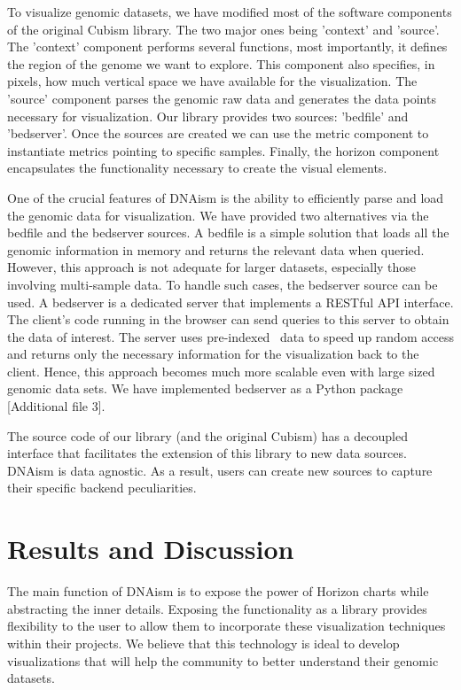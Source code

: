 \documentclass[twocolumn]{bmcart}
\begin{document}
To visualize genomic datasets, we have modified most of the software components
of the original Cubism library.  The two major ones being 'context' and
'source'.  The 'context' component performs several functions, most
importantly, it defines the region of the genome we want to explore. This
component also specifies, in pixels, how much vertical space we have available
for the visualization.  The 'source' component parses the genomic raw data and
generates the data points necessary for visualization. Our library provides two
sources: 'bedfile' and 'bedserver'. Once the sources are created we can use the
metric component to instantiate metrics pointing to specific samples.  Finally,
the horizon component encapsulates the functionality necessary to create the
visual elements.

One of the crucial features of DNAism is the ability to efficiently parse and
load the genomic data for visualization. We have provided two alternatives via
the bedfile and the bedserver sources. A bedfile is a simple solution that
loads all the genomic information  in memory and returns the relevant data when
queried.  However, this approach is not adequate for larger datasets,
especially those involving multi-sample data. To handle such cases, the
bedserver source can be used. A bedserver is a dedicated server that implements
a RESTful API interface. The client's code running in the browser can send
queries to this server to obtain the data of interest.  The server uses
pre-indexed~\cite{tabix-li} data to speed up random access and returns only the
necessary information for the visualization back to the client.  Hence, this
approach becomes much more scalable even with large sized genomic data sets. We
have implemented bedserver as a Python package [Additional file 3].

The source code of our library (and the original Cubism) has a decoupled
interface that facilitates the extension of this library to new data sources.
DNAism is data agnostic. As a result, users can create new sources to capture
their specific backend peculiarities.


\section*{Results and Discussion}


The main function of DNAism is to expose the power of Horizon charts while
abstracting the inner details. Exposing the functionality as a library provides
flexibility to the user to allow them to incorporate these visualization
techniques within their projects. We believe that this technology is ideal to
develop visualizations that will help the community to better understand their
genomic datasets. 
\end{document}
